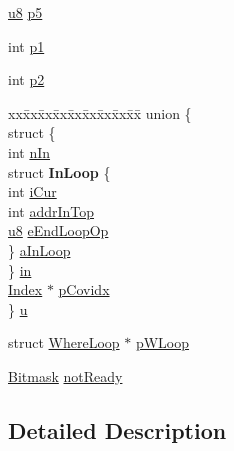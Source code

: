 \begin{DoxyCompactItemize}
\item 
\hyperlink{sqlite3_8c_a74a0f6424ae628af25f23f0a35f6ead3}{u8} \hyperlink{struct_where_level_a8308037057f2acf587d898607ed08fd6}{p5}
\item 
int \hyperlink{struct_where_level_a8d5504470de9fec69f0389092910c500}{p1}
\item 
int \hyperlink{struct_where_level_a2fbbf5056a49832e7d5e73a15ae2ee05}{p2}
\item 
\begin{tabbing}
xx\=xx\=xx\=xx\=xx\=xx\=xx\=xx\=xx\=\kill
union \{\\
\>struct \{\\
\>\>int \hyperlink{struct_where_level_a38d379d826c7b4c49ecb1127003d77ec}{nIn}\\
\>\>struct {\bfseries InLoop} \{\\
\>\>\>int \hyperlink{struct_where_level_ad4234df4b7f768520fbd6a92a2b0023c}{iCur}\\
\>\>\>int \hyperlink{struct_where_level_a886641bc6cd2d7c225935df257fd81d1}{addrInTop}\\
\>\>\>\hyperlink{sqlite3_8c_a74a0f6424ae628af25f23f0a35f6ead3}{u8} \hyperlink{struct_where_level_a8ef3a5e578750b0362269451c8ff61fa}{eEndLoopOp}\\
\>\>\} \hyperlink{struct_where_level_ae0cc3758f11e91d94000fc81e2b6ccea}{aInLoop}\\
\>\} \hyperlink{struct_where_level_ad1f454e084d0af91edb9f23999732cec}{in}\\
\>\hyperlink{struct_index}{Index} $\ast$ \hyperlink{struct_where_level_ad38e62acb47a76c40ab4fcbcfdb0ce18}{pCovidx}\\
\} \hyperlink{struct_where_level_a97b2ee0306e1c3cf789e790a1f64befa}{u}\\

\end{tabbing}\item 
struct \hyperlink{struct_where_loop}{Where\+Loop} $\ast$ \hyperlink{struct_where_level_a2e21955e3f7fb01607e9b12a7d2101a0}{p\+W\+Loop}
\item 
\hyperlink{sqlite3_8c_afa77b629897c4457bfdc47d364ba5c3f}{Bitmask} \hyperlink{struct_where_level_a432cf7620a98e0241a9e3a773683b603}{not\+Ready}
\end{DoxyCompactItemize}


\subsection{Detailed Description}


